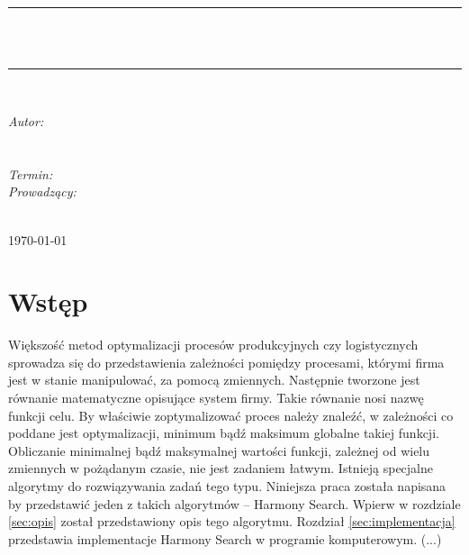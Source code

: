 \documentclass[10pt, a4paper]{article}
\begin{document}
\def\tablename{Tabela}	%
\begin{titlepage}
	\begin{center}
		\textsc{\LARGE \formakursu}\\[1cm]		
		\textsc{\Large \kurs}\\[0.5cm]		
		\rule{\textwidth}{0.08cm}\\[1cm]
		{\huge \bfseries \doctype}\\[1cm]
		\rule{\textwidth}{0.08cm}\\[1cm]
		\begin{flushright} \large
		\emph{Autor: }\\
		\osobaA\\
		\osobaB\\[0.4cm]
		\emph{Termin: }\termin\\[0.4cm]
		\emph{Prowadzący:} \\
		\prowadzacy \\
		\end{flushright}
		\vfill
		{\large \today}
	\end{center}	
\end{titlepage}
\newpage
\tableofcontents
\newpage

\section{Wstęp}
\label{sec:wstep}
Większość metod optymalizacji procesów produkcyjnych czy logistycznych sprowadza się do przedstawienia zależności pomiędzy procesami, którymi firma jest w stanie manipulować, za pomocą zmiennych. Następnie tworzone jest równanie matematyczne opisujące system firmy. Takie równanie nosi nazwę funkcji celu. By właściwie zoptymalizować proces należy znaleźć, w zależności co poddane jest optymalizacji, minimum bądź maksimum globalne takiej funkcji. Obliczanie minimalnej bądź maksymalnej wartości funkcji, zależnej od wielu zmiennych w pożądanym czasie, nie jest zadaniem łatwym. Istnieją specjalne algorytmy do rozwiązywania zadań tego typu. Niniejsza praca została napisana by przedstawić jeden z takich algorytmów -- Harmony Search. Wpierw w rozdziale \ref{sec:opis} został przedstawiony opis tego algorytmu. Rozdział \ref{sec:implementacja} przedstawia implementacje Harmony Search w programie komputerowym. (...)

\begin{figure}[htbp]
	\centering
	\label{fig:nazwa}
\end{figure}
\end{document}

